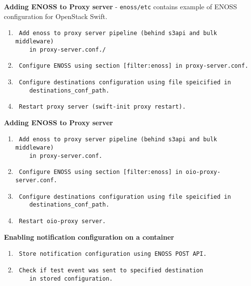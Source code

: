 \textbf{Adding ENOSS to Proxy server} - \texttt{enoss/etc} contains example of ENOSS configuration for OpenStack Swift.
\begin{enumerate}
    \item \begin{verbatim} Add enoss to proxy server pipeline (behind s3api and bulk middleware)
    in proxy-server.conf./\end{verbatim}
    \item \begin{verbatim} Configure ENOSS using section [filter:enoss] in proxy-server.conf.\end{verbatim}
    \item \begin{verbatim} Configure destinations configuration using file speicified in
    destinations_conf_path. \end{verbatim}
    \item \begin{verbatim} Restart proxy server (swift-init proxy restart).\end{verbatim}
\end{enumerate}

\textbf{Adding ENOSS to Proxy server}
\begin{enumerate}
    \item \begin{verbatim} Add enoss to proxy server pipeline (behind s3api and bulk middleware)
    in proxy-server.conf.\end{verbatim}
    \item \begin{verbatim} Configure ENOSS using section [filter:enoss] in oio-proxy-server.conf.\end{verbatim}
    \item \begin{verbatim} Configure destinations configuration using file speicified in
    destinations_conf_path. \end{verbatim}
    \item \begin{verbatim} Restart oio-proxy server.\end{verbatim}
\end{enumerate}

\textbf{Enabling notification configuration on a container}
\begin{enumerate}
    \item \begin{verbatim} Store notification configuration using ENOSS POST API.\end{verbatim}
    \item \begin{verbatim} Check if test event was sent to specified destination
    in stored configuration.\end{verbatim}
\end{enumerate}




